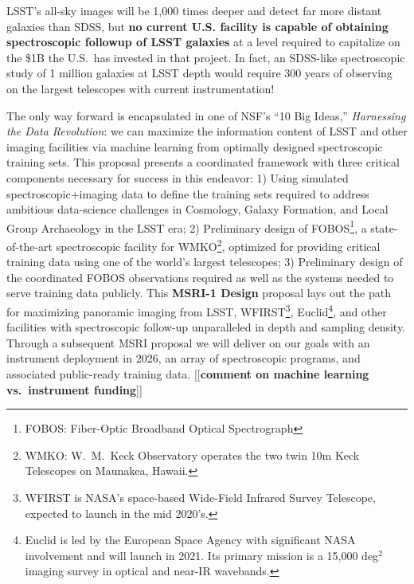 \documentclass[oneside,11pt]{amsart}
\newcommand{\comment}[2][todo]{{\color{#1}[[{\bf #2}]]}}
\begin{document}

LSST's all-sky images will be 1,000 times deeper and detect far more
distant galaxies than SDSS, but \textbf{no current U.S. facility is
capable of obtaining spectroscopic followup of LSST galaxies} at a level
required to capitalize on the \$1B the U.S.\ has invested in that
project.  In fact, an SDSS-like spectroscopic study of 1 million
galaxies at LSST depth would require 300 years of observing on the
largest telescopes with current instrumentation!  

The only way forward is encapsulated in one of NSF's ``10 Big Ideas,''
\emph{Harnessing the Data Revolution}: we can maximize the information
content of LSST and other imaging facilities via machine learning from
optimally designed spectroscopic training sets.  This proposal presents
a coordinated framework with three critical components necessary for
success in this endeavor: 1) Using simulated spectroscopic$+$imaging
data to define the training sets required to address ambitious
data-science challenges in Cosmology, Galaxy Formation, and Local Group
Archaeology in the LSST era; 2) Preliminary design of
FOBOS\footnote{FOBOS: Fiber-Optic Broadband Optical Spectrograph}, a
state-of-the-art spectroscopic facility for WMKO\footnote{WMKO: W.~M.\ Keck Observatory operates the two twin 10m Keck Telescopes on
Maunakea, Hawaii.}, optimized for providing critical training data using
one of the world's largest telescopes; 3) Preliminary design of the
coordinated FOBOS observations required as well as the systems needed to
serve training data publicly.  This {\bf MSRI-1 Design} proposal lays
out the path for maximizing panoramic imaging from LSST,
WFIRST\footnote{WFIRST is NASA's space-based Wide-Field Infrared Survey
Telescope, expected to launch in the mid 2020's.},
Euclid\footnote{Euclid is led by the European Space Agency with
significant NASA involvement and will launch in 2021. Its primary
mission is a 15,000 deg$^2$ imaging survey in optical and near-IR
wavebands.}, and other facilities with spectroscopic follow-up
unparalleled in depth and sampling density.  Through a subsequent MSRI
proposal we will deliver on our goals with an instrument deployment in
2026, an array of spectroscopic programs, and associated public-ready
training data.  \comment{comment on machine learning vs.\ instrument
funding}
\end{document}
